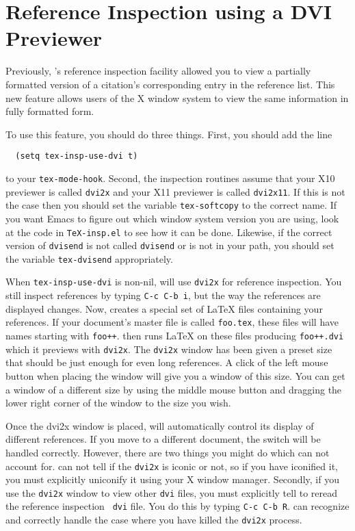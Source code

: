 \section{Reference Inspection using a DVI Previewer}

Previously, {\TM}'s reference inspection facility allowed you to view
a partially formatted version of a citation's corresponding entry in
the reference list.  This new feature allows users of the X window
system to view the same information in fully formatted form.  

To use this feature, you should do three things.  First, you should
add the line 
\begin{verbatim}
  (setq tex-insp-use-dvi t)
\end{verbatim}
to your {\tt tex-mode-hook}.  Second, the inspection routines assume
that your X10 previewer is called {\tt dvi2x} and your X11 previewer
is called {\tt dvi2x11}.  If this is not the case then you should set
the variable {\tt tex-softcopy} to the correct name.  If you want
Emacs to figure out which window system version you are using, look at
the code in {\tt TeX-insp.el} to see how it can be done.  Likewise, if
the correct version of {\tt dvisend} is not called {\tt dvisend} or is
not in your path, you should set the variable {\tt tex-dvisend}
appropriately.

When {\tt tex-insp-use-dvi} is non-nil, {\TM} will use {\tt dvi2x} for
reference inspection.  You still inspect references by typing
\verb+C-c C-b i+, but the way the references are displayed changes.
Now, {\TM} creates a special set of {\LaTeX} files containing your
references.  If your document's master file is called {\tt foo.tex},
these files will have names starting with {\tt foo++}.  {\TM} then
runs {\LaTeX} on these files producing {\tt foo++.dvi} which it
previews with {\tt dvi2x}.  The {\tt dvi2x} window has been given a
preset size that should be just enough for even long references.  A
click of the left mouse button when placing the window will give you a
window of this size.  You can get a window of a different size by
using the middle mouse button and dragging the lower right corner of
the window to the size you wish.  

Once the dvi2x window is placed, {\TM} will automatically control its
display of different references.  If you move to a different document,
the switch will be handled correctly.  However, there are two things
you might do which {\TM} can not account for.  {\TM} can not tell if
the {\tt dvi2x} is iconic or not, so if you have iconified it, you
must explicitly uniconify it using your X window manager.  Secondly,
if you use the {\tt dvi2x} window to view other {\tt dvi} files, you
must explicitly tell {\TM} to reread the reference inspection {\tt
dvi} file.  You do this by typing \verb+C-c C-b R+.  {\TM} can
recognize and correctly handle the case where you have killed the
{\tt dvi2x} process.

